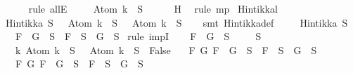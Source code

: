 \begin{isabellebody}
\ \ \ \ \isamarkupfalse%
\ {\isacharparenleft}rule\ allE{\isacharparenright}\isanewline
\ \ \isamarkupfalse%
\ {\isachardoublequoteopen}\isactrlbold {\isasymnot}\ {\isacharparenleft}Atom\ k{\isacharparenright}\ {\isasymnotin}\ S{\isachardoublequoteclose}\isanewline
\ \ \ \ \isamarkupfalse%
\ H\ \isamarkupfalse%
\ {\isacharparenleft}rule\ mp{\isacharparenright}\isanewline
{}\isamarkupfalse%
%
\endisatagproof
{\isafoldproof}%
%
\isadelimproof
\isanewline
%
\endisadelimproof
\isanewline
{}\isamarkupfalse%
\ Hintikka{\isacharunderscore}l{}{\isacharcolon}\ \isanewline
\ {\isachardoublequoteopen}Hintikka\ S\ {\isasymLongrightarrow}\ \ {\isacharparenleft}Atom\ k\ {\isasymin}\ S\ {\isasymlongrightarrow}\ \isactrlbold {\isasymnot}\ {\isacharparenleft}Atom\ k{\isacharparenright}\ {\isasymnotin}\ S{\isacharparenright}{\isachardoublequoteclose}\isanewline
%
\isadelimproof
\ \ %
\endisadelimproof
%
\isatagproof
{}\isamarkupfalse%
\ {\isacharparenleft}smt\ Hintikka{\isacharunderscore}def{\isacharparenright}%
\endisatagproof
{\isafoldproof}%
%
\isadelimproof
\isanewline
%
\endisadelimproof
\isanewline
{}\isamarkupfalse%
\ \isanewline
\ \ \ {\isachardoublequoteopen}Hintikka\ S{\isachardoublequoteclose}\isanewline
\ \ \ {\isachardoublequoteopen}F\ \isactrlbold {\isasymand}\ G\ {\isasymin}\ S\ {\isasymlongrightarrow}\ F\ {\isasymin}\ S\ {\isasymand}\ G\ {\isasymin}\ S{\isachardoublequoteclose}\isanewline
%
\isadelimproof
%
\endisadelimproof
%
\isatagproof
{}\isamarkupfalse%
\ {\isacharparenleft}rule\ impI{\isacharparenright}\isanewline
\ \ \isamarkupfalse%
\ {\isachardoublequoteopen}F\ \isactrlbold {\isasymand}\ G\ {\isasymin}\ S{\isachardoublequoteclose}\isanewline
\ \isamarkupfalse%
\ {\isachardoublequoteopen}{\isasymbottom}\ {\isasymnotin}\ S\isanewline
\ \ {\isasymand}\ {\isacharparenleft}{\isasymforall}k{\isachardot}\ Atom\ k\ {\isasymin}\ S\ {\isasymlongrightarrow}\ \isactrlbold {\isasymnot}\ {\isacharparenleft}Atom\ k{\isacharparenright}\ {\isasymin}\ S\ {\isasymlongrightarrow}\ False{\isacharparenright}\isanewline
\ \ {\isasymand}\ {\isacharparenleft}{\isasymforall}F\ G{\isachardot}\ F\ \isactrlbold {\isasymand}\ G\ {\isasymin}\ S\ {\isasymlongrightarrow}\ F\ {\isasymin}\ S\ {\isasymand}\ G\ {\isasymin}\ S{\isacharparenright}\isanewline
\ \ {\isasymand}\ {\isacharparenleft}{\isasymforall}F\ G{\isachardot}\ F\ \isactrlbold {\isasymor}\ G\ {\isasymin}\ S\ {\isasymlongrightarrow}\ F\ {\isasymin}\ S\ {\isasymor}\ G\ {\isasymin}\ S{\isacharparenright}\isanewline

\end{isabellebody}
